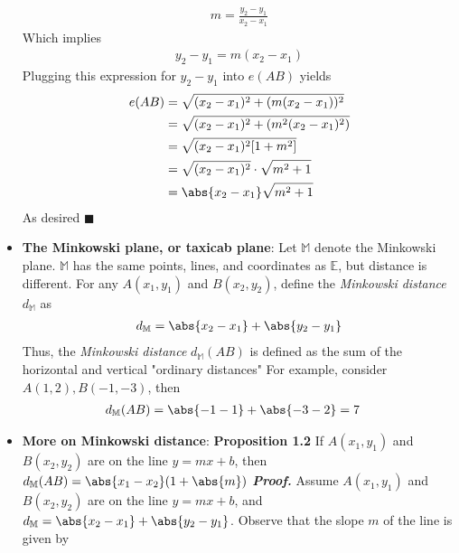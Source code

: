 \documentclass{report}
\begin{document}
\begin{itemize}
            \begin{align*}
                m = \frac{y_{2} - y_{1}}{x_{2} - x_{1}}
            \end{align*}
            Which implies 
            \begin{align*}
                y_{2} - y_{1} = m(x_{2} - x_{1})
            \end{align*}
            Plugging this expression for $y_{2} -y_{1}$ into $e(AB)$ yields
            \begin{align*}
                e(AB) &= \sqrt{(x_{2} - x_{1})^{2} + (m(x_{2}-x_{1}))^{2}} \\
                      &= \sqrt{(x_{2} - x_{1})^{2} + (m^{2}(x_{2}-x_{1})^{2})} \\
                      &= \sqrt{(x_{2}-x_{1})^{2}[1 + m^{2}]} \\
                      &= \sqrt{(x_{2} - x_{1})^{2}} \cdot \sqrt{m^{2} + 1} \\
                      &= \abs{x_{2} - x_{1}} \sqrt{m^{2} + 1} 
            \end{align*}
            As desired \hspace*{\fill}$\blacksquare$ 
        \item \textbf{The Minkowski plane, or taxicab plane}: Let $\mathbb{M}$ denote the Minkowski plane. $\mathbb{M}$ has the same points, lines, and coordinates as $\mathbb{E}$, but distance is different. For any $A(x_{1}, y_{1})$ and $B(x_{2}, y_{2})$, define the \textit{Minkowski distance} $d_{\mathbb{M}}$ as
            \begin{align*}
                d_{\mathbb{M}} = \abs{x_{2} - x_{1}} + \abs{y_{2} - y_{1}}
            \end{align*}
            Thus, the \textit{Minkowski distance} $d_{\mathbb{M}}(AB)$ is defined as the sum of the horizontal and vertical "ordinary distances"
            \bigbreak \noindent 
            For example, consider $A(1,2), B(-1,-3)$, then 
            \begin{align*}
                d_{\mathbb{M}}(AB) &= \abs{-1-1} + \abs{-3-2} = 7
            \end{align*}
        \item \textbf{More on Minkowski distance}:
            \bigbreak \noindent 
            \textbf{Proposition 1.2} If $A(x_{1}, y_{1})$ and $B(x_{2}, y_{2}) $ are on the line $y=mx+b$, then $d_{\mathbb{M}}(AB) = \abs{x_{1} - x_{2}}(1+\abs{m})$
            \bigbreak \noindent 
            \textbf{\textit{Proof.}} Assume $A(x_{1}, y_{1})$ and $B(x_{2}, y_{2}) $ are on the line $y=mx+b$, and $d_{\mathbb{M}} = \abs{x_2-x_1} + \abs{y_{2} - y_{1}}$. Observe that the slope $m$ of the line is given by

\end{itemize}
\end{document}
